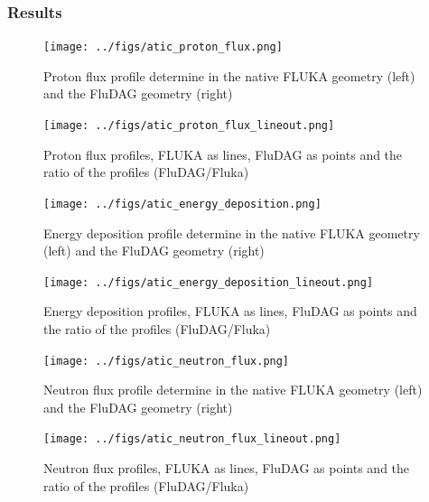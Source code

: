 \subsubsection*{Results}
\begin{figure}[ht!]
 \begin{centering}
 \centering
 \texttt{[image: ../figs/atic\_proton\_flux.png]}
 \caption{Proton flux profile determine in the native FLUKA geometry (left) and
          the FluDAG geometry (right)}
 \label{fig:atic_proton_flux}
 \end{centering}
\end{figure}
\begin{figure}[ht!]
 \begin{centering}
 \centering
 \texttt{[image: ../figs/atic\_proton\_flux\_lineout.png]}
 \caption{Proton flux profiles, FLUKA as lines, FluDAG as points and the ratio
          of the profiles (FluDAG/Fluka)}
 \label{fig:atic_proton_flux_lineout}
 \end{centering}
\end{figure}

\begin{figure}[ht!]
 \begin{centering}
 \centering
 \texttt{[image: ../figs/atic\_energy\_deposition.png]}
 \caption{Energy deposition profile determine in the native FLUKA geometry
         (left) and the FluDAG geometry (right)}
 \label{fig:atic_energy_deposition}
 \end{centering}
\end{figure}
\begin{figure}[ht!]
 \begin{centering}
 \centering
 \texttt{[image: ../figs/atic\_energy\_deposition\_lineout.png]}
 \caption{Energy deposition profiles, FLUKA as lines, FluDAG as points and the
          ratio of the profiles (FluDAG/Fluka)}
 \label{fig:atic_energy_deposition_lineout}
 \end{centering}
\end{figure}

\begin{figure}[ht!]
 \begin{centering}
 \centering
 \texttt{[image: ../figs/atic\_neutron\_flux.png]}
 \caption{Neutron flux profile determine in the native FLUKA geometry (left) and
         the FluDAG geometry (right)}
 \label{fig:atic_neutron_flux}
 \end{centering}
\end{figure}
\begin{figure}[ht!]
 \begin{centering}
 \centering
 \texttt{[image: ../figs/atic\_neutron\_flux\_lineout.png]}
 \caption{Neutron flux profiles, FLUKA as lines, FluDAG as points and the ratio
         of the profiles (FluDAG/Fluka)}
 \label{fig:atic_neutron_flux_lineout}
 \end{centering}
\end{figure}

